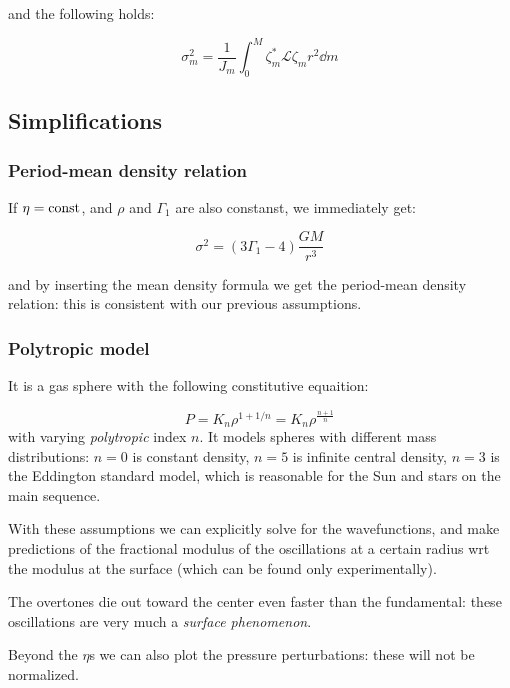 \documentclass[main.tex]{subfiles}
\begin{document}
and the following holds:

\begin{equation}
  \sigma_m^2 = \frac{1}{J_m} \int_0^M \zeta_m ^* \mathcal L \zeta_m r^2 \dd{m}
\end{equation}

\subsection{Simplifications}

\subsubsection{Period-mean density relation}

If \(\eta = \text{const}\), and \(\rho \) and \(\Gamma_1\) are also constanst, we immediately get:

\begin{equation}
  \sigma^2 = (3 \Gamma_1 - 4) \frac{GM}{r^3}
\end{equation}

and by inserting the mean density formula we get the period-mean density relation: this is consistent with our previous assumptions.

\subsubsection{Polytropic model}

It is a gas sphere with the following constitutive equaition:

\begin{equation}
  P = K_n \rho^{1 + 1/n} = K_n \rho^{\frac{n+1}{n}}
\end{equation}
%
with varying \emph{polytropic} index \(n\).
It models spheres with different mass distributions:
\(n=0\) is constant density, \(n=5\) is infinite central density, \(n=3\) is the Eddington standard model, which is reasonable for the Sun and stars on the main sequence.

With these assumptions we can explicitly solve for the wavefunctions, and make predictions of the fractional modulus of the oscillations at a certain radius wrt the modulus at the surface (which can be found only experimentally).

The overtones die out toward the center even faster than the fundamental: these oscillations are very much a \emph{surface phenomenon}.

Beyond the \(\eta\)s we can also plot the pressure perturbations: these will not be normalized.
\end{document}
